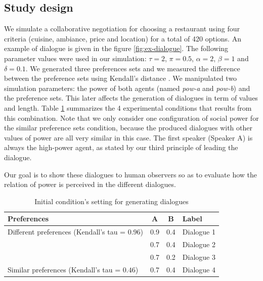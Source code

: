 \documentclass{llncs}
\begin{document}
		\subsection{Study design}
		We simulate a collaborative negotiation for choosing a restaurant using four criteria (cuisine, ambiance, price and location) for a total of 420 options. An example of dialogue is given in the figure \ref{fig:ex-dialogue}. The following parameter values were used in our simulation: $\tau=2$, $\pi=0.5$, $\alpha=2$, $\beta=1$ and $\delta=0.1$. We generated three preferences sets and we measured the difference between the preference sets using Kendall's distance \cite{bra2013Kendall}. We manipulated two simulation parameters: the power of both agents (named \emph{pow-a} and \emph{pow-b}) and the preference sets. This later affects the generation of dialogues in term of values and length.  Table \ref{table:conditions} summarizes the 4 experimental conditions that results from this combination. Note that we only consider one configuration of social power for the similar preference sets condition, because the produced dialogues with other values of power are all very similar in this case. The first speaker (Speaker A) is always the high-power agent, as stated by our third principle of leading the dialogue.
		
		
		Our goal is to show these dialogues to human observers so as to evaluate how the relation of power is perceived in the different dialogues.
		\begin{table}[t]
			\centering
			\begin{tabular}{ |l|c|c|l| }
				\hline
				\textbf{Preferences}& \textbf{A} & \textbf{B} & \textbf{Label} \\ 
				\hline
				\newline\multirow{3}{*} {Different preferences (Kendall's tau = $0.96$)} & 0.9 & 0.4 & Dialogue 1 \\ \cline{2-4}
				
				\newline  & 0.7 & 0.4 & Dialogue 2\\ \cline{2-4}
				
				\newline   &0.7 & 0.2 & Dialogue 3\\ 
				\hline
				\newline Similar preferences (Kendall's tau = $0.46$) & 0.7 & 0.4 & Dialogue 4\\
				\hline
			\end{tabular}
			\caption{Initial condition's setting for generating dialogues} 
			\label{table:conditions}
		\end{table}
		
\end{document}
